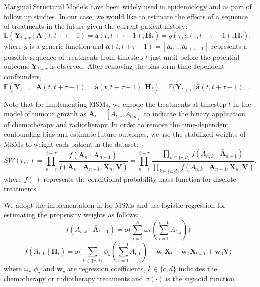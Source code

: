 \documentclass{article} %
\newcommand{\vc}[1]{\mathbf{#1}}
\newcommand{\hist}[1]{\bar{\vc{#1}}}
\begin{document}
	Marginal Structural Models \citep{robins2000marginal, hernan2001marginal} have been widely used in epidemiology and as part of follow up studies. In our case, we would like to estimate the effects of a sequence of treatments in the future given the current patient history: 
	\begin{equation}
	\mathbb{E}(\vc{Y}_{t+\tau} \mid \hist{A}(t, t+\tau -1 ) =  \hist{a}(t, t+\tau -1 ),  \bar{\vc{H}}_{t}) = g(\tau, a(t, t+\tau-1), \hist{H}_t) ,
	\end{equation} 
	where $g$ is a generic function and $\hist{a}(t, t+\tau-1) = [\vc{a}_{t}, \dots \vc{a}_{{t+\tau -1 }}]$ represents a possible sequence of treatments from timestep $t$ just until before the potential outcome $\vc{Y}_{t+\tau}$ is observed. After removing the bias form time-dependent confounders, $\mathbb{E}(\vc{Y}_{t+\tau} \mid \hist{A}(t, t+\tau -1 ) =  \hist{a}(t, t+\tau -1 ),  \bar{\vc{H}}_{t}) = \mathbb{E}(\vc{Y}_{t+\tau}[\hist{a}(t, t+\tau -1 )]$.
	
	Note that for implementing MSMs, we encode the treatments at timestep $t$ in the model of tumour growth as $\vc{A}_t = [A_{t, c}, A_{t, d}]$ to indicate the binary application of chemotherapy and radiotherapy. In order to remove the time-dependent confounding bias and estimate future outcomes, we use the stabilized weights of MSMs to weight each patient in the dataset: 
	\begin{equation}
	SW(t, \tau) = \prod_{n=t}^{t+\tau} \dfrac{f(\vc{A}_n \mid\hist{A}_{n-1})}{f(\vc{A}_n \mid \hist{A}_{n-1}, \hist{X}_{n}, \vc{V})} =  \prod_{n=t}^{t+\tau} \dfrac{\prod_{k\in\{c, d\}} f(A_{n, k} \mid\hist{A}_{n-1})}{ \prod_{k\in\{c, d\}} f(A_{n, k} \mid \hist{A}_{n-1}, \hist{X}_{n}, \vc{V})},
	\end{equation}
	where $f(\cdot)$ represents the conditional probability mass function for discrete treatments. 
		
	
	We adopt the implementation in \citep{hernan2001marginal, howe2012estimating, lim2018forecasting} for MSMs and use logistic regression for estimating the propensity weights as follows: 
	\begin{equation}
	f(A_{t,k} \mid \hist{A}_{t-1}) = \sigma \Big(\sum_{j=1}^k \omega_{k}  (\sum_{i=1}^{t-1} A_{t,j}) \Big)
	\end{equation}
	\begin{equation}
	f(A_{t,k} \mid  \hist{H}_{t}) = \sigma \Big(\sum_{k\in\{c, d\}} \phi_{k}  (\sum_{i=1}^{t-1} A_{t,k})   
	+ \vc{w}_1 \vc{X}_t + \vc{w}_2 \vc{X}_{t-1} + \vc{w}_3 \vc{V} \Big)
	\end{equation}
	where $\omega_{\star}, \phi_{\star}$ and $\vc{w}_{\star}$ are regression coefficients, $k\in\{c, d\}$ indicates the chemotherapy or radiotherapy treatments and $\sigma(\cdot)$ is the sigmoid function. 
	
\end{document}
